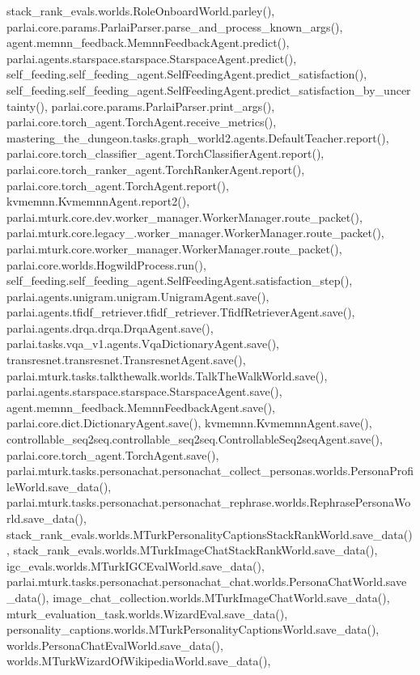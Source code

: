 stack\+\_\+rank\+\_\+evals.\+worlds.\+Role\+Onboard\+World.\+parley(), parlai.\+core.\+params.\+Parlai\+Parser.\+parse\+\_\+and\+\_\+process\+\_\+known\+\_\+args(), agent.\+memnn\+\_\+feedback.\+Memnn\+Feedback\+Agent.\+predict(), parlai.\+agents.\+starspace.\+starspace.\+Starspace\+Agent.\+predict(), self\+\_\+feeding.\+self\+\_\+feeding\+\_\+agent.\+Self\+Feeding\+Agent.\+predict\+\_\+satisfaction(), self\+\_\+feeding.\+self\+\_\+feeding\+\_\+agent.\+Self\+Feeding\+Agent.\+predict\+\_\+satisfaction\+\_\+by\+\_\+uncertainty(), parlai.\+core.\+params.\+Parlai\+Parser.\+print\+\_\+args(), parlai.\+core.\+torch\+\_\+agent.\+Torch\+Agent.\+receive\+\_\+metrics(), mastering\+\_\+the\+\_\+dungeon.\+tasks.\+graph\+\_\+world2.\+agents.\+Default\+Teacher.\+report(), parlai.\+core.\+torch\+\_\+classifier\+\_\+agent.\+Torch\+Classifier\+Agent.\+report(), parlai.\+core.\+torch\+\_\+ranker\+\_\+agent.\+Torch\+Ranker\+Agent.\+report(), parlai.\+core.\+torch\+\_\+agent.\+Torch\+Agent.\+report(), kvmemnn.\+Kvmemnn\+Agent.\+report2(), parlai.\+mturk.\+core.\+dev.\+worker\+\_\+manager.\+Worker\+Manager.\+route\+\_\+packet(), parlai.\+mturk.\+core.\+legacy\+\_.\+worker\+\_\+manager.\+Worker\+Manager.\+route\+\_\+packet(), parlai.\+mturk.\+core.\+worker\+\_\+manager.\+Worker\+Manager.\+route\+\_\+packet(), parlai.\+core.\+worlds.\+Hogwild\+Process.\+run(), self\+\_\+feeding.\+self\+\_\+feeding\+\_\+agent.\+Self\+Feeding\+Agent.\+satisfaction\+\_\+step(), parlai.\+agents.\+unigram.\+unigram.\+Unigram\+Agent.\+save(), parlai.\+agents.\+tfidf\+\_\+retriever.\+tfidf\+\_\+retriever.\+Tfidf\+Retriever\+Agent.\+save(), parlai.\+agents.\+drqa.\+drqa.\+Drqa\+Agent.\+save(), parlai.\+tasks.\+vqa\+\_\+v1.\+agents.\+Vqa\+Dictionary\+Agent.\+save(), transresnet.\+transresnet.\+Transresnet\+Agent.\+save(), parlai.\+mturk.\+tasks.\+talkthewalk.\+worlds.\+Talk\+The\+Walk\+World.\+save(), parlai.\+agents.\+starspace.\+starspace.\+Starspace\+Agent.\+save(), agent.\+memnn\+\_\+feedback.\+Memnn\+Feedback\+Agent.\+save(), parlai.\+core.\+dict.\+Dictionary\+Agent.\+save(), kvmemnn.\+Kvmemnn\+Agent.\+save(), controllable\+\_\+seq2seq.\+controllable\+\_\+seq2seq.\+Controllable\+Seq2seq\+Agent.\+save(), parlai.\+core.\+torch\+\_\+agent.\+Torch\+Agent.\+save(), parlai.\+mturk.\+tasks.\+personachat.\+personachat\+\_\+collect\+\_\+personas.\+worlds.\+Persona\+Profile\+World.\+save\+\_\+data(), parlai.\+mturk.\+tasks.\+personachat.\+personachat\+\_\+rephrase.\+worlds.\+Rephrase\+Persona\+World.\+save\+\_\+data(), stack\+\_\+rank\+\_\+evals.\+worlds.\+M\+Turk\+Personality\+Captions\+Stack\+Rank\+World.\+save\+\_\+data(), stack\+\_\+rank\+\_\+evals.\+worlds.\+M\+Turk\+Image\+Chat\+Stack\+Rank\+World.\+save\+\_\+data(), igc\+\_\+evals.\+worlds.\+M\+Turk\+I\+G\+C\+Eval\+World.\+save\+\_\+data(), parlai.\+mturk.\+tasks.\+personachat.\+personachat\+\_\+chat.\+worlds.\+Persona\+Chat\+World.\+save\+\_\+data(), image\+\_\+chat\+\_\+collection.\+worlds.\+M\+Turk\+Image\+Chat\+World.\+save\+\_\+data(), mturk\+\_\+evaluation\+\_\+task.\+worlds.\+Wizard\+Eval.\+save\+\_\+data(), personality\+\_\+captions.\+worlds.\+M\+Turk\+Personality\+Captions\+World.\+save\+\_\+data(), worlds.\+Persona\+Chat\+Eval\+World.\+save\+\_\+data(), worlds.\+M\+Turk\+Wizard\+Of\+Wikipedia\+World.\+save\+\_\+data(), 